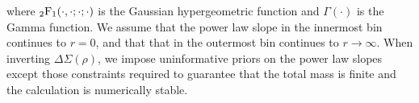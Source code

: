 \documentclass[usenatbib]{mnras}
\begin{document}
where ${}_2{\rm F}_1(\cdot,\cdot;\cdot;\cdot)$ is the Gaussian hypergeometric function and $\Gamma(\cdot)$ is the Gamma function. We assume that the power law slope in the innermost bin continues to $r=0$, and that that in the outermost bin continues to $r\rightarrow\infty$. When inverting $\Delta\Sigma(\rho)$, we impose uninformative priors on the power law slopes except those constraints required to guarantee that the total mass is finite and the calculation is numerically stable.

\bsp	%
\label{lastpage}
\end{document}
